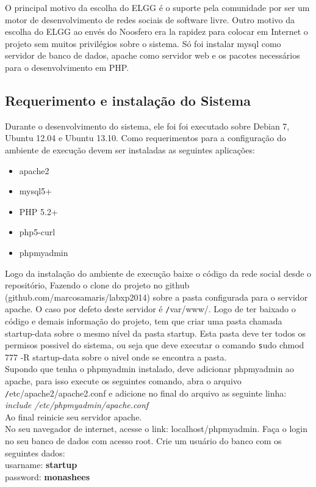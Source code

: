 \documentclass[12pt, letterpaper, onecolumn]{article}
\begin{document}
O principal motivo da escolha do ELGG é o suporte pela comunidade por ser um motor de desenvolvimento de redes sociais de software livre. Outro motivo da escolha do ELGG ao envés do Noosfero era la rapidez para colocar em Internet o projeto sem muitos privilégios sobre o sistema. Só foi instalar mysql como servidor de banco de dados, apache como servidor web e os pacotes necessários para o desenvolvimento em PHP.

\subsection{Requerimento e instalação do Sistema} 
Durante o desenvolvimento do sistema, ele foi foi executado sobre Debian 7, Ubuntu 12.04 e Ubuntu 13.10. Como requerimentos para a configuração do ambiente de execução devem ser instaladas as seguintes aplicações:
\begin{itemize}
\item apache2
\item mysql5+
\item PHP 5.2+
\item php5-curl
\item phpmyadmin
\end{itemize}

Logo da instalação do ambiente de execução baixe o código da rede social desde o repositório, Fazendo o clone do projeto no github (github.com/marcosamaris/labxp2014) sobre a pasta configurada para o servidor apache. O caso por defeto deste servidor é {\texttt /var/www/}. Logo de ter baixado o código e demais informação do projeto, tem que criar uma pasta chamada startup-data sobre o mesmo nível da pasta startup. Esta pasta deve ter todos os permisos possivel do sistema, ou seja que deve executar o comando {\texttt sudo chmod 777 -R startup-data} sobre o nivel onde se encontra a pasta.\\

Supondo que tenha o phpmyadmin instalado, deve adicionar phpmyadmin ao apache, para isso execute os seguintes comando, abra o arquivo {\texttt /etc/apache2/apache2.conf} e adicione no final do arquivo as seguinte linha: {\it include /etc/phpmyadmin/apache.conf\\} 
Ao final  reinicie seu servidor apache.\\
   
No seu navegador de internet, acesse o link: localhost/phpmyadmin. Faça o login no seu banco de dados com acesso root. Crie um usuário do banco com os seguintes dados:\\
        usarname: {\bf startup}\\
        password: {\bf monashees}\\
\end{document}
